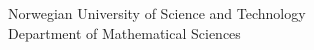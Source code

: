 \begin{titlepage}
    \vfill
    
    \begin{center}
        {\color{ntnu-blue}\sffamily\Large Norwegian University of Science and Technology}\\
        \vspace{0.3cm}
        {\sffamily\large Department of Mathematical Sciences}
    \end{center}
    
    \vspace{1cm}
\end{titlepage}


